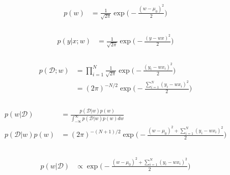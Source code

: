 \documentclass[12pt, fleqn]{article}
\begin{document}
\subsubsection{}
\begin{equation*}
  \begin{aligned}
    p(w) & = \frac{1}{\sqrt{2 \pi}} \exp \bigg( -\frac{(w - \mu_0)^2}{2} \bigg)
  \end{aligned}
\end{equation*}

\subsubsection{}
\begin{equation*}
  \begin{aligned}
    p(y | x; w) & = \frac{1}{\sqrt{2 \pi}} \exp \bigg( -\frac{(y - wx)^2}{2} \bigg)
  \end{aligned}
\end{equation*}

\subsubsection{}
\begin{equation*}
  \begin{aligned}
    p(\mathcal{D}; w) & = \prod_{i=1}^N \frac{1}{\sqrt{2 \pi}} \exp \bigg( -\frac{(y_i - wx_i)^2}{2} \bigg) \\
                      & = (2 \pi)^{-N/2} \exp \bigg( -\frac{\sum_{i=1}^N (y_i - wx_i)^2}{2} \bigg)
  \end{aligned}
\end{equation*}

\subsubsection{}
\begin{equation*}
  \begin{aligned}
    p(w | \mathcal{D})      & = \frac{p(\mathcal{D} | w) p(w)}{\int_{-\infty}^{\infty} p(\mathcal{D} | w) p(w) dw}           \\
    p(\mathcal{D} | w) p(w) & = (2 \pi)^{-(N+1)/2} \exp \bigg( -\frac{(w - \mu_0)^2 + \sum_{i=1}^N (y_i - wx_i)^2}{2} \bigg) \\
  \end{aligned}
\end{equation*}

\subsubsection{}
\begin{equation*}
  \begin{aligned}
    p(w | \mathcal{D}) & \propto \exp \bigg( -\frac{(w - \mu_0)^2 + \sum_{i=1}^N (y_i - wx_i)^2}{2} \bigg) \\
  \end{aligned}
\end{equation*}
\end{document}
